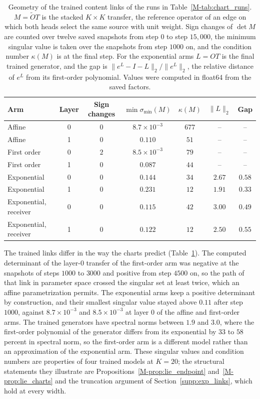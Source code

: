 \documentclass[twoside,11pt]{article}
\begin{document}
\begin{table}[htbp]
\centering
\footnotesize
\begin{tabular}{@{}lcccccc@{}}
\toprule
Arm & Layer & Sign changes & $\min\sigma_{\min}(M)$ & $\kappa(M)$ & $\|L\|_2$ & Gap \\
\midrule
Affine & 0 & $0$ & $8.7\times10^{-3}$ & $677$ & -- & -- \\
Affine & 1 & $0$ & $0.110$ & $51$ & -- & -- \\
First order & 0 & $2$ & $8.5\times10^{-3}$ & $79$ & -- & -- \\
First order & 1 & $0$ & $0.087$ & $44$ & -- & -- \\
Exponential & 0 & $0$ & $0.144$ & $34$ & $2.67$ & $0.58$ \\
Exponential & 1 & $0$ & $0.231$ & $12$ & $1.91$ & $0.33$ \\
Exponential, receiver & 0 & $0$ & $0.115$ & $42$ & $3.00$ & $0.49$ \\
Exponential, receiver & 1 & $0$ & $0.122$ & $12$ & $2.50$ & $0.55$ \\
\bottomrule
\end{tabular}
\caption{Geometry of the trained content links of the runs in Table~\ref{M-tab:chart_runs}. $M=\widetilde OT$ is the stacked $K\times K$ transfer, the reference operator of an edge on which both heads select the same source with unit weight. Sign changes of $\det M$ are counted over twelve saved snapshots from step $0$ to step $15{,}000$, the minimum singular value is taken over the snapshots from step $1000$ on, and the condition number $\kappa(M)$ is at the final step. For the exponential arms $L=OT$ is the final trained generator, and the gap is $\|e^L-I-L\|_2/\|e^L\|_2$, the relative distance of $e^L$ from its first-order polynomial. Values were computed in float64 from the saved factors.}
\label{tab:chart_geometry}
\end{table}

The trained links differ in the way the charts predict (Table~\ref{tab:chart_geometry}). The computed determinant of the layer-0 transfer of the first-order arm was negative at the snapshots of steps $1000$ to $3000$ and positive from step $4500$ on, so the path of that link in parameter space crossed the singular set at least twice, which an affine parametrization permits. The exponential arms keep a positive determinant by construction, and their smallest singular value stayed above $0.11$ after step $1000$, against $8.7\times10^{-3}$ and $8.5\times10^{-3}$ at layer 0 of the affine and first-order arms. The trained generators have spectral norms between $1.9$ and $3.0$, where the first-order polynomial of the generator differs from its exponential by $33$ to $58$ percent in spectral norm, so the first-order arm is a different model rather than an approximation of the exponential arm. These singular values and condition numbers are properties of four trained models at $K=20$; the structural statements they illustrate are Propositions~\ref{M-prop:lie_endpoint} and~\ref{M-prop:lie_charts} and the truncation argument of Section~\ref{supp:exp_links}, which hold at every width.
\end{document}
